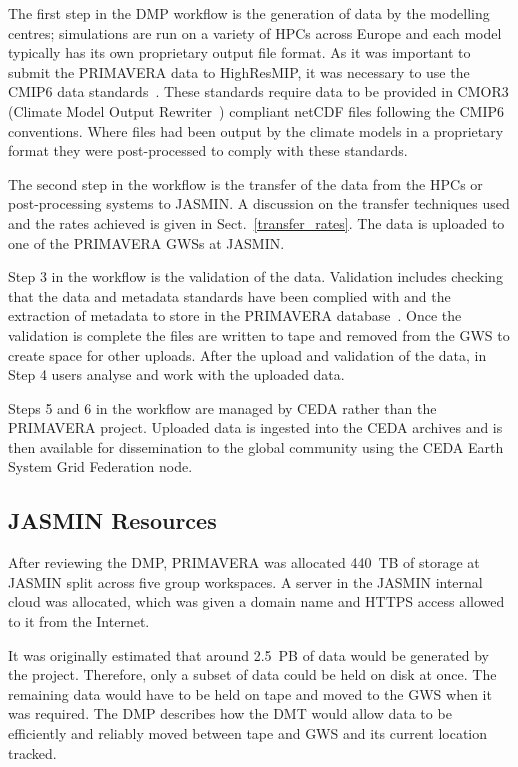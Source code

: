 \documentclass[gmd, manuscript]{copernicus}
\begin{document}
The first step in the DMP workflow is the generation of data by the modelling centres; simulations are run on a variety of HPCs across Europe and each model typically has its own proprietary output file format. As it was important to submit the PRIMAVERA data to HighResMIP, it was necessary to use the CMIP6 data standards~\citep{gmd-11-3659-2018}. These standards require data to be provided in CMOR3 (Climate Model Output Rewriter~\citep{Nadeau2019}) compliant netCDF files following the CMIP6 conventions. Where files had been output by the climate models in a proprietary format they were post-processed to comply with these standards.

The second step in the workflow is the transfer of the data from the HPCs or post-processing systems to JASMIN. A discussion on the transfer techniques used and the rates achieved is given in Sect.~\ref{transfer_rates}. The data is uploaded to one of the PRIMAVERA GWSs at JASMIN.

Step 3 in the workflow is the validation of the data. Validation includes checking that the data and metadata standards have been complied with and the extraction of metadata to store in the PRIMAVERA database~\citep{Seddon2020}. Once the validation is complete the files are written to tape and removed from the GWS to create space for other uploads. After the upload and validation of the data, in Step 4 users analyse and work with the uploaded data. 

Steps 5 and 6 in the workflow are managed by CEDA rather than the PRIMAVERA project. Uploaded data is ingested into the CEDA archives and is then available for dissemination to the global community using the CEDA Earth System Grid Federation node.


\subsection{JASMIN Resources}

After reviewing the DMP, PRIMAVERA was allocated 440~TB of storage at JASMIN split across  five group workspaces. A server in the JASMIN internal cloud was allocated, which was given a domain name and  HTTPS access allowed to it from the Internet.

It was originally estimated that around 2.5~PB of data would be generated by the project. Therefore, only a subset of data could be held on disk at once. The remaining data would have to be held on tape and moved to the GWS when it was required. The DMP describes how the DMT would allow data to be efficiently and reliably moved between tape and GWS and its current location tracked.
\end{document}
